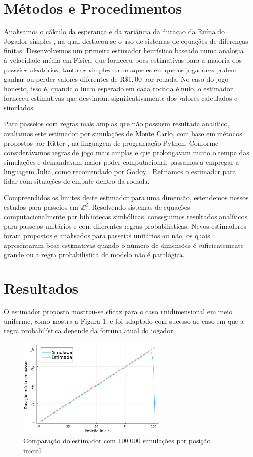 \documentclass[a4paper,10pt,twocolumn]{article}
\begin{document}
\section{Métodos e Procedimentos}

Analisamos o cálculo da esperança e da variância da duração da Ruína do Jogador
simples \cite{andel_variance_2012}, na qual destacou-se o uso de sistemas de
equações de diferenças finitas. Desenvolvemos um primeiro estimador heurístico
baseado numa analogia à velocidade média em Física, que forneceu boas
estimativas  para a maioria dos passeios aleatórios, tanto os simples como
aqueles em que os jogadores podem ganhar ou perder valores diferentes de
$\mathrm{R}\$1,00$ por rodada. No caso do jogo honesto, isso é, quando o lucro
esperado em cada rodada é nulo, o estimador forneceu estimativas que desviaram
significativamente dos valores calculados e simulados.

Para passeios com regras mais amplas que não possuem resultado analítico,
avaliamos este estimador por simulações de Monte Carlo, com base em métodos
propostos por Ritter \cite{ritter_determining_2011}, na linguagem de programação
Python. Conforme considerávamos regras de jogo mais amplas e que prolongavam
muito o tempo das simulações e demandavam maior poder computacional, passamos a
empregar a linguagem Julia, como recomendado por Godoy
\cite{godoy_evaluating_2023}. Refinamos o estimador para lidar com situações de
empate dentro da rodada.

Compreendidos os limites deste estimador para uma dimensão, estendemos nossos
estudos para passeios em $\mathbb{Z}^d$. Resolvendo sistemas de equações
computacionalmente por bibliotecas simbólicas, conseguimos resultados analíticos
para passeios unitários e com diferentes regras probabilísticas. Novos
estimadores foram propostos e analisados para passeios unitários ou não, os
quais apresentaram boas estimativas quando o número de dimensões é
suficientemente grande ou a regra probabilística do modelo não é patológica.

\section{Resultados}

O estimador proposto mostrou-se eficaz para o caso unidimensional em meio
uniforme, como mostra a Figura 1, e foi adaptado com sucesso ao caso em que a
regra probabilística depende da fortuna atual do jogador.

\begin{figure}[H]
    \centering
    \includegraphics[width=7.5cm]{"graficoest.pdf"}
    \centering
    \caption{Comparação do estimador com 100.000 simulações por posição inicial}
\end{figure}
\end{document}
